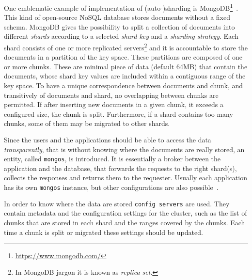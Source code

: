 One emblematic example of implementation of (auto-)sharding is
MongoDB\footnote{\url{https://www.mongodb.com/}}~\cite{bib:mongodb}. This kind
of open-source NoSQL database stores documents without a fixed schema.
MongoDB gives the possibility to split a collection of documents into
different \emph{shards} according to a selected \emph{shard key} and a
\emph{sharding strategy}. Each shard consists of one or more replicated
servers\footnote{In MongoDB jargon it is known as \emph{replica set}.} and
it is accountable to store the documents in a partition of the key space.
These partitions are composed of one or more chunks. These are minimal piece of
data (default 64MB) that contain the documents, whose shard key values are
included within a contiguous range of the key space. To have a unique
correspondence between documents and chunk, and transitively of documents
and shard, no overlapping between chunks are permitted.
If after inserting new documents in a given chunk, it exceeds a configured
size, the chunk is split. Furthermore, if a shard contains too many chunks,
some of them may be migrated to other shards.


Since the users and the applications should be able to access the data
\emph{transparently}, that is without knowing where the documents are really
stored, an entity, called \texttt{mongos}, is introduced. It is essentially a
broker between the application and the database, that forwards the requests to
the right shard(s), collects the responses and returns them to the requester.
Usually each application has its own \texttt{mongos} instance, but other
configurations are also possible~\cite{bib:mongodb}.

In order to know where the data are stored \texttt{config servers} are
used. They contain metadata and the configuration settings for the
cluster, such as the list of chunks that are stored in each shard and the ranges
covered by the chunks. Each time a chunk is split or migrated these settings
should be updated.

